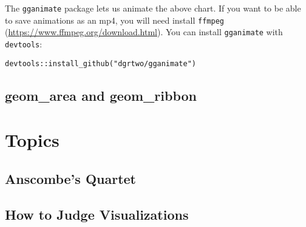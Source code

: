 \documentclass[]{book}
\newenvironment{Shaded}{\begin{snugshade}}{\end{snugshade}}
\newcommand{\KeywordTok}[1]{\textcolor[rgb]{0.13,0.29,0.53}{\textbf{{#1}}}}
\newcommand{\DataTypeTok}[1]{\textcolor[rgb]{0.13,0.29,0.53}{{#1}}}
\newcommand{\StringTok}[1]{\textcolor[rgb]{0.31,0.60,0.02}{{#1}}}
\newcommand{\NormalTok}[1]{{#1}}
\begin{document}
The \texttt{gganimate} package lets us animate the above chart. If you
want to be able to save animations as an mp4, you will need install
\texttt{ffmpeg} (\url{https://www.ffmpeg.org/download.html}). You can
install \texttt{gganimate} with \texttt{devtools}:

\begin{verbatim}
devtools::install_github("dgrtwo/gganimate")
\end{verbatim}

\begin{Shaded}
\end{Shaded}

\chapter{geom\_area and geom\_ribbon}\label{area-and-ribbons}

\part{Topics}\label{part-topics}

\chapter*{Anscombe's Quartet}\label{anscombe}

\chapter*{How to Judge Visualizations}\label{trifecta}


\end{document}
